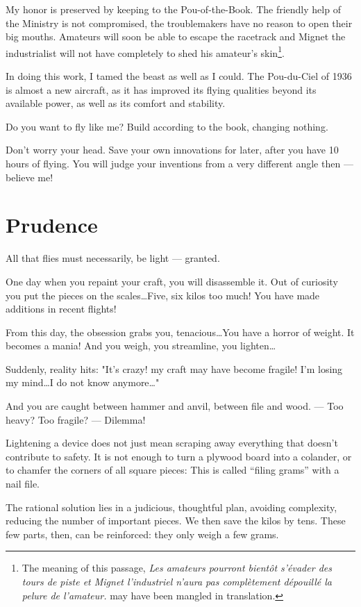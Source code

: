 \documentclass{book}
\begin{document}
My honor is preserved by keeping to the Pou-of-the-Book. The friendly
help of the Ministry is not compromised, the troublemakers have no
reason to open their big mouths. Amateurs will soon be able to escape
the racetrack and Mignet the industrialist will not have completely to
shed his amateur's skin\footnote{The meaning of this passage,
  \textit{\guillemotleft Les amateurs pourront bient\^ot s'\'evader
    des tours de piste et Mignet l'industriel n'aura pas
    compl\`etement d\'epouill\'e la pelure de
    l'amateur.\guillemotright} may have been mangled in translation.}.

In doing this work, I tamed the beast as well as I could. The
Pou-du-Ciel of 1936 is almost a new aircraft, as it has improved its
flying qualities beyond its available power, as well as its comfort
and stability.

Do you want to fly like me?  Build according to the book, changing
nothing.

Don't worry your head.  Save your own innovations for later, after you
have 10 hours of flying.  You will judge your inventions from a very
different angle then --- believe me!

\section{Prudence}

All that flies must necessarily, be light --- granted.

One day when you repaint your craft, you will disassemble it. Out of
curiosity you put the pieces on the scales\ldots Five, six kilos too
much! You have made additions in recent flights!

From this day, the obsession grabs you, tenacious\ldots You have a
horror of weight. It becomes a mania! And you weigh, you streamline,
you lighten\ldots

Suddenly, reality hits: "It's crazy! my craft may have become fragile!
I'm losing my mind\ldots I do not know anymore\ldots"

And you are caught between hammer and anvil, between file and
wood. --- Too heavy? Too fragile? --- Dilemma!

Lightening a device does not just mean scraping away everything that
doesn't contribute to safety. It is not enough to turn a plywood board
into a colander, or to chamfer the corners of all square pieces: This
is called ``filing grams'' with a nail file.

The rational solution lies in a judicious, thoughtful plan, avoiding
complexity, reducing the number of important pieces. We then save the
kilos by tens. These few parts, then, can be reinforced: they only
weigh a few grams.
\end{document}
